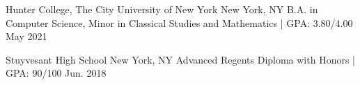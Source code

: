 

\begin{cventries}

  \cventryposition
    {Hunter College, The City University of New York} %
    {New York, NY} %
    {B.A. in Computer Science, Minor in Classical Studies and Mathematics | GPA: 3.80/4.00} %
    {May 2021} %

\cventryposition
    {Stuyvesant High School} %
    {New York, NY} %
    {Advanced Regents Diploma with Honors | GPA: 90/100} %
    {Jun. 2018} %

\end{cventries}
